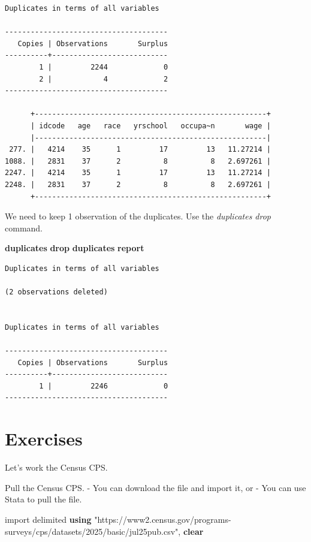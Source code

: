 \documentclass[
]{book}
\newenvironment{Shaded}{\begin{snugshade}}{\end{snugshade}}
\newcommand{\KeywordTok}[1]{\textcolor[rgb]{0.13,0.29,0.53}{\textbf{#1}}}
\newcommand{\NormalTok}[1]{#1}
\newcommand{\StringTok}[1]{\textcolor[rgb]{0.31,0.60,0.02}{#1}}
\begin{document}
\begin{verbatim}
Duplicates in terms of all variables

--------------------------------------
   Copies | Observations       Surplus
----------+---------------------------
        1 |         2244             0
        2 |            4             2
--------------------------------------

      +------------------------------------------------------+
      | idcode   age   race   yrschool   occupa~n       wage |
      |------------------------------------------------------|
 277. |   4214    35      1         17         13   11.27214 |
1088. |   2831    37      2          8          8   2.697261 |
2247. |   4214    35      1         17         13   11.27214 |
2248. |   2831    37      2          8          8   2.697261 |
      +------------------------------------------------------+
\end{verbatim}

We need to keep 1 observation of the duplicates. Use the \emph{duplicates drop} command.

\begin{Shaded}
\begin{Highlighting}[]
\KeywordTok{duplicates} \KeywordTok{drop}
\KeywordTok{duplicates} \KeywordTok{report}
\end{Highlighting}
\end{Shaded}

\begin{verbatim}
Duplicates in terms of all variables

(2 observations deleted)


Duplicates in terms of all variables

--------------------------------------
   Copies | Observations       Surplus
----------+---------------------------
        1 |         2246             0
--------------------------------------
\end{verbatim}

\chapter{Exercises}\label{exercises}

Let's work the Census CPS.

Pull the Census CPS.
- You can download the file and import it, or
- You can use Stata to pull the file.

\begin{Shaded}
\begin{Highlighting}[]
\NormalTok{import delimited }\KeywordTok{using} \StringTok{"https://www2.census.gov/programs{-}surveys/cps/datasets/2025/basic/jul25pub.csv"}\NormalTok{, }\KeywordTok{clear}
\end{Highlighting}
\end{Shaded}
\end{document}
